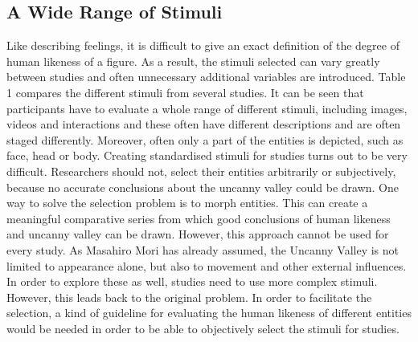 \subsection{A Wide Range of Stimuli}
Like describing feelings, it is difficult to give an exact definition of the degree of human likeness of a figure. As a result, the stimuli selected can vary greatly between studies and often unnecessary additional variables are introduced. 
Table 1 compares the different stimuli from several studies. It can be seen that participants have to evaluate a whole range of different stimuli, including images, videos and interactions and these often have different descriptions and are often staged differently. Moreover, often only a part of the entities is depicted, such as face, head or body.
Creating standardised stimuli for studies turns out to be very difficult. Researchers should not, select their entities arbitrarily or subjectively, because no accurate conclusions about the uncanny valley could be drawn. 
One way to solve the selection problem is to morph entities. This can create a meaningful comparative series from which good conclusions of human likeness and uncanny valley can be drawn. However, this approach cannot be used for every study. As Masahiro Mori has already assumed, the Uncanny Valley is not limited to appearance alone, but also to movement and other external influences. In order to explore these as well, studies need to use more complex stimuli. However, this leads back to the original problem.  In order to facilitate the selection, a kind of guideline for evaluating the human likeness of different entities would be needed in order to be able to objectively select the stimuli for studies. 

